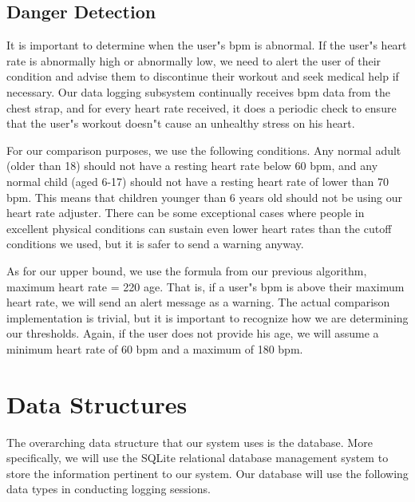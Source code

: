 \documentclass[letterpaper,english, 12pt]{scrreprt}
\begin{document}
\subsection{Danger Detection \newline}

It is important to determine when the user"s bpm is abnormal. If the user"s heart rate is abnormally high or abnormally low, we need to alert the user of their condition and advise them to discontinue their workout and seek medical help if necessary. Our data logging subsystem continually receives bpm data from the chest strap, and for every heart rate received, it does a periodic check to ensure that the user"s workout doesn"t cause an unhealthy stress on his heart. \newline

For our comparison purposes, we use the following conditions. Any normal adult (older than 18) should not have a resting heart rate below 60 bpm, and any normal child (aged 6-17) should not have a resting heart rate of lower than 70 bpm. This means that children younger than 6 years old should not be using our heart rate adjuster. There can be some exceptional cases where people in excellent physical conditions can sustain even lower heart rates than the cutoff conditions we used, but it is safer to send a warning anyway. \newline

As for our upper bound, we use the formula from our previous algorithm, maximum heart rate = 220 \textendash age. That is, if a user"s bpm is above their maximum heart rate, we will send an alert message as a warning. The actual comparison implementation is trivial, but it is important to recognize how we are determining our thresholds. Again, if the user does not provide his age, we will assume a minimum heart rate of 60 bpm and a maximum of 180 bpm. \newline



 \section{Data Structures}

The overarching data structure that our system uses is the database. More specifically, we will use the SQLite relational database management system to store the information pertinent to our system. Our database will use the following data types in conducting logging sessions. \newline
\end{document}
